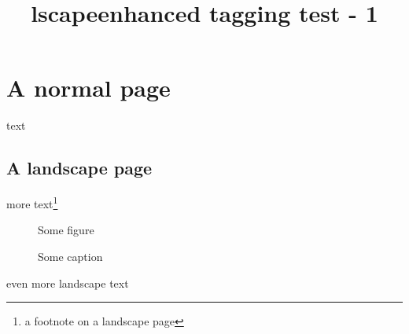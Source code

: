 \documentclass{article}
\title{lscapeenhanced tagging test - 1}
\begin{document}
\section{A normal page}
text

\begin{landscape}
\section{A landscape page}
more text\footnote{a footnote on a landscape page}
\begin{figure}
\centering
Some figure
\caption{Some caption}
\end{figure}

\newpage

even more landscape text
\end{landscape}
\end{document}

